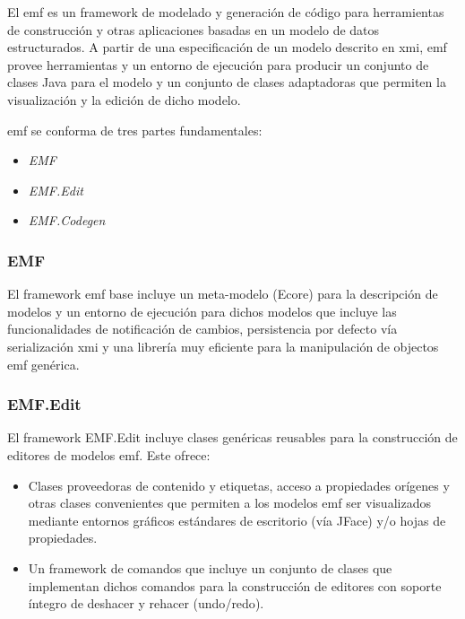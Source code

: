 \documentclass[a4paper,12pt,oneside,spanish]{book}
\begin{document}
El \gls{emf} es un framework de modelado y generación de código para herramientas de construcción y otras aplicaciones basadas en un modelo de datos estructurados. A partir de una especificación de un modelo descrito en \gls{xmi}, \gls{emf} provee herramientas y un entorno de ejecución para producir un conjunto de clases \textsf{Java} para el modelo y un conjunto de clases adaptadoras que permiten la visualización y la edición de dicho modelo.

\gls{emf} se conforma de tres partes fundamentales:

\begin{itemize}
\item \textit{EMF}
\item \textit{EMF.Edit}
\item \textit{EMF.Codegen}
\end{itemize}


\subsubsection{EMF}

El framework \gls{emf} base incluye un meta-modelo (\textsf{Ecore}) para la descripción de modelos y un entorno de ejecución para dichos modelos que incluye las funcionalidades de notificación de cambios, persistencia por defecto vía serialización \gls{xmi} y una librería muy eficiente para la manipulación de objectos \gls{emf} genérica.

\subsubsection{EMF.Edit}

El framework EMF.Edit incluye clases genéricas reusables para la construcción de editores de modelos \gls{emf}. Este ofrece:

\begin{itemize}

\item Clases proveedoras de contenido y etiquetas, acceso a propiedades orígenes y otras clases convenientes que permiten a los modelos \gls{emf} ser visualizados mediante entornos gráficos estándares de escritorio (vía \textsf{JFace}) y/o hojas de propiedades.

\item Un framework de comandos que incluye un conjunto de clases que implementan dichos comandos para la construcción de editores con soporte íntegro de deshacer y rehacer (\textsf{undo}/\textsf{redo}).

\end{itemize}
\end{document}
